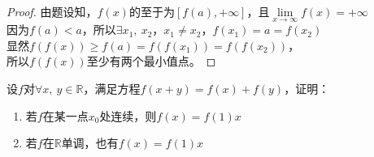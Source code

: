 \begin{proof}
    
    由题设知，$f(x)$的至于为$[f(a),+\infty]$，且$\lim\limits_{x\to\infty}{f(x)}=+\infty$\\
    因为$f(a)<a$，所以$\exists x_1,\ x_2$，$x_1 \neq x_2$，$f(x_1) = a = f(x_2)$\\
    显然$f(f(x))\geq f(a) = f(f(x_1)) = f(f(x_2))$，\\
    所以$f(f(x))$至少有两个最小值点。

\end{proof}

\begin{proposition}[Cauthy方程]
    
    设$f$对$\forall x,\ y \in \mathbb{R}$，满足方程$f(x+y) = f(x) + f(y)$，证明：

    \begin{enumerate}

        \item 若$f$在某一点$x_0$处连续，则$f(x) = f(1)x$
        
        \item 若$f$在$\mathbb{R}$单调，也有$f(x) = f(1)x$
        
    \end{enumerate}

\end{proposition}

